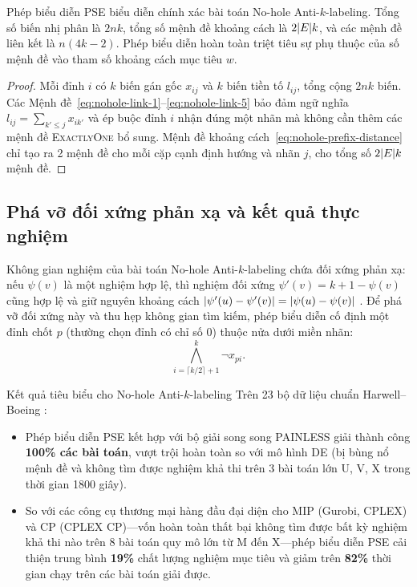 \begin{proposition}
\label{prop:nohole-pse-complexity}
Phép biểu diễn \mbox{\textnormal{\textsc{PSE}}} biểu diễn chính xác bài toán No-hole Anti-\(k\)-labeling. Tổng số biến nhị phân là \(2nk\), tổng số mệnh đề khoảng cách là \(2\lvert E\rvert k\), và các mệnh đề liên kết là \(n(4k-2)\). Phép biểu diễn hoàn toàn triệt tiêu sự phụ thuộc của số mệnh đề vào tham số khoảng cách mục tiêu \(w\).
\end{proposition}

\begin{proof}
Mỗi đỉnh \(i\) có \(k\) biến gán gốc \(x_{ij}\) và \(k\) biến tiền tố \(l_{ij}\), tổng cộng \(2nk\) biến. Các Mệnh đề~\eqref{eq:nohole-link-1}--\eqref{eq:nohole-link-5} bảo đảm ngữ nghĩa \(l_{ij} = \sum_{k'\le j}x_{ik'}\) và ép buộc đỉnh \(i\) nhận đúng một nhãn mà không cần thêm các mệnh đề \textsc{ExactlyOne} bổ sung. Mệnh đề khoảng cách~\eqref{eq:nohole-prefix-distance} chỉ tạo ra 2 mệnh đề cho mỗi cặp cạnh định hướng và nhãn \(j\), cho tổng số \(2\lvert E\rvert k\) mệnh đề.
\end{proof}

\subsection{Phá vỡ đối xứng phản xạ và kết quả thực nghiệm}

Không gian nghiệm của bài toán No-hole Anti-\(k\)-labeling chứa đối xứng phản xạ: nếu \(\psi(v)\) là một nghiệm hợp lệ, thì nghiệm đối xứng \(\psi'(v) = k + 1 - \psi(v)\) cũng hợp lệ và giữ nguyên khoảng cách \(\lvert \psi'(u) - \psi'(v)\rvert = \lvert \psi(u) - \psi(v)\rvert\) \parencite{hai2026nohole}. Để phá vỡ đối xứng này và thu hẹp không gian tìm kiếm, phép biểu diễn cố định một đỉnh chốt \(p\) (thường chọn đỉnh có chỉ số 0) thuộc nửa dưới miền nhãn:
\begin{equation}
  \bigwedge_{i=\lceil k/2 \rceil + 1}^k \neg x_{pi}.
  \label{eq:nohole-symmetry-breaking}
\end{equation}

\begin{resultbox}{Kết quả tiêu biểu cho No-hole Anti-\(k\)-labeling}
Trên 23 bộ dữ liệu chuẩn Harwell--Boeing \parencite{hai2026nohole}:
\begin{itemize}
  \item Phép biểu diễn \mbox{\textnormal{\textsc{PSE}}} kết hợp với bộ giải song song PAINLESS giải thành công \textbf{100\% các bài toán}, vượt trội hoàn toàn so với mô hình \mbox{\textnormal{\textsc{DE}}} (bị bùng nổ mệnh đề và không tìm được nghiệm khả thi trên 3 bài toán lớn U, V, X trong thời gian 1800 giây).
  \item So với các công cụ thương mại hàng đầu đại diện cho MIP (Gurobi, CPLEX) và CP (CPLEX CP)---vốn hoàn toàn thất bại không tìm được bất kỳ nghiệm khả thi nào trên 8 bài toán quy mô lớn từ M đến X---phép biểu diễn \mbox{\textnormal{\textsc{PSE}}} cải thiện trung bình \textbf{19\%} chất lượng nghiệm mục tiêu và giảm trên \textbf{82\%} thời gian chạy trên các bài toán giải được.
\end{itemize}
\end{resultbox}

